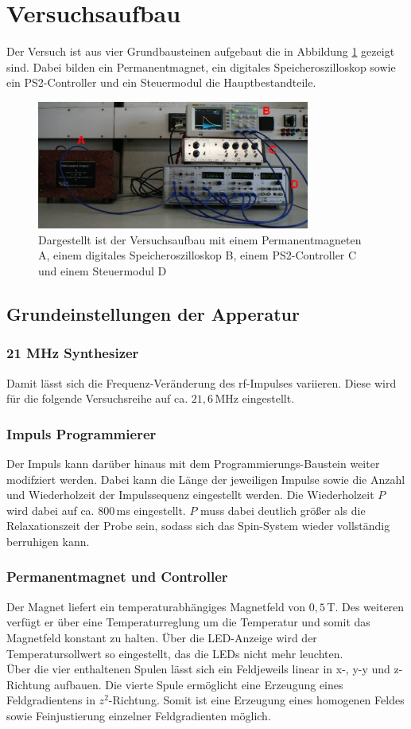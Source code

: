 \section{Versuchsaufbau}
Der Versuch ist aus vier Grundbausteinen aufgebaut die in Abbildung \ref{fig:versuchsaufbau}
gezeigt sind. Dabei bilden ein Permanentmagnet, ein digitales Speicheroszilloskop sowie ein
PS2-Controller und ein Steuermodul die Hauptbestandteile.
\begin{figure}
    \center
    \includegraphics[width=0.8\textwidth]{bilder/versuchsaufbau.jpg}
    \caption{Dargestellt ist der Versuchsaufbau mit einem Permanentmagneten A, einem digitales Speicheroszilloskop B, einem
    PS2-Controller C und einem Steuermodul D\cite{anleitung}}
    \label{fig:versuchsaufbau}
\end{figure}

\subsection{Grundeinstellungen der Apperatur}
\subsubsection*{21 MHz Synthesizer}
Damit lässt sich die Frequenz-Veränderung des rf-Impulses variieren. Diese wird für die folgende
Versuchsreihe auf ca. $21,6\,$MHz eingestellt.
\subsubsection*{Impuls Programmierer}
Der Impuls kann darüber hinaus mit dem Programmierungs-Baustein weiter modifziert werden.
Dabei kann die Länge der jeweiligen Impulse sowie die Anzahl und Wiederholzeit der Impulssequenz eingestellt werden.
Die Wiederholzeit $P$ wird dabei auf ca. $800\,$ms eingestellt. $P$ muss dabei deutlich größer als die Relaxationszeit der Probe sein,
sodass sich das Spin-System wieder vollständig berruhigen kann.
\subsubsection*{Permanentmagnet und Controller}
Der Magnet liefert ein temperaturabhängiges Magnetfeld von $0,5\,$T. Des weiteren verfügt er 
über eine Temperaturreglung um die Temperatur und somit das Magnetfeld konstant zu halten. 
Über die LED-Anzeige wird der Temperatursollwert so eingestellt, das die LEDs nicht mehr leuchten.\\
Über die vier enthaltenen Spulen lässt sich ein 
Feldjeweils linear in x-, y-y und z-Richtung aufbauen. Die vierte Spule ermöglicht eine Erzeugung eines Feldgradientens
in $z^2$-Richtung. Somit ist eine Erzeugung eines homogenen Feldes sowie Feinjustierung einzelner Feldgradienten möglich.

